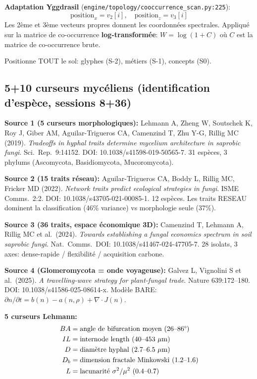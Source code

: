 \documentclass[11pt,a4paper]{article}
\begin{document}
\textbf{Adaptation Yggdrasil} (\texttt{engine/topology/cooccurrence\_scan.py:225}):
\begin{equation}
\text{position}_x = v_2[i], \quad \text{position}_z = v_3[i]
\end{equation}
Les 2\`eme et 3\`eme vecteurs propres donnent les coordonn\'ees spectrales.
Appliqu\'e sur la matrice de co-occurrence \textbf{log-transform\'ee}: $W = \log(1 + C)$
o\`u $C$ est la matrice de co-occurrence brute.

Positionne TOUT le sol: glyphes (S-2), m\'etiers (S-1), concepts (S0).

\subsection{5+10 curseurs myc\'eliens (identification d'esp\`ece, sessions 8+36)}

\textbf{Source 1 (5 curseurs morphologiques):}
Lehmann A, Zheng W, Soutschek K, Roy J, Giber AM, Aguilar-Trigueros CA,
Camenzind T, Zhu Y-G, Rillig MC (2019).
\textit{Tradeoffs in hyphal traits determine mycelium architecture in saprobic fungi}.
Sci.\ Rep.\ 9:14152. DOI: 10.1038/s41598-019-50565-7.
31 esp\`eces, 3 phylums (Ascomycota, Basidiomycota, Mucoromycota).

\textbf{Source 2 (15 traits r\'eseau):}
Aguilar-Trigueros CA, Boddy L, Rillig MC, Fricker MD (2022).
\textit{Network traits predict ecological strategies in fungi}.
ISME Comms.\ 2:2. DOI: 10.1038/s43705-021-00085-1.
12 esp\`eces. Les traits RESEAU dominent la classification (46\% variance)
vs morphologie seule (37\%).

\textbf{Source 3 (36 traits, espace \'economique 3D):}
Camenzind T, Lehmann A, Rillig MC et al.\ (2024).
\textit{Towards establishing a fungal economics spectrum in soil saprobic fungi}.
Nat.\ Comms.\ DOI: 10.1038/s41467-024-47705-7.
28 isolats, 3 axes: dense-rapide / flexibilit\'e / acquisition carbone.

\textbf{Source 4 (Glomeromycota = onde voyageuse):}
Galvez L, Vignolini S et al.\ (2025).
\textit{A travelling-wave strategy for plant-fungal trade}.
Nature 639:172--180. DOI: 10.1038/s41586-025-08614-x.
Mod\`ele BARE: $\partial n / \partial t = b(n) - a(n,\rho) + \nabla \cdot J(n)$.

\textbf{5 curseurs Lehmann:}
\begin{align}
BA &= \text{angle de bifurcation moyen (26--86\textdegree)} \\
IL &= \text{internode length (40--453 $\mu$m)} \\
D  &= \text{diam\`etre hyphal (2.7--6.5 $\mu$m)} \\
D_b &= \text{dimension fractale Minkowski (1.2--1.6)} \\
L  &= \text{lacunarit\'e $\sigma^2/\mu^2$ (0.4--0.7)}
\end{align}
\end{document}
